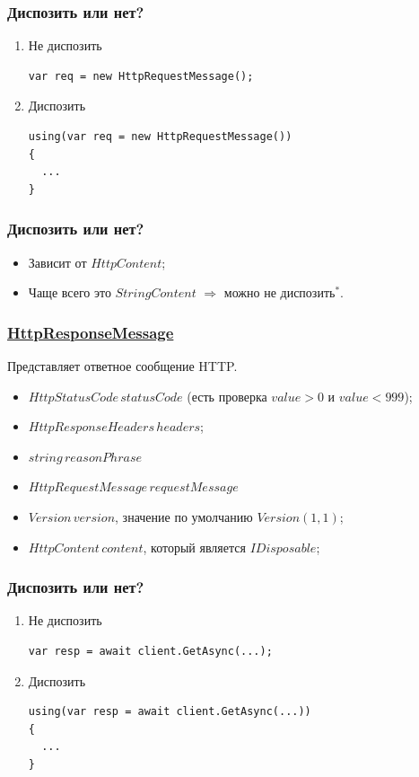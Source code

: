 \documentclass[17pt,aspectratio=169]{beamer}
\begin{document}
\begin{frame}[fragile]
\frametitle{Диспозить или нет?}
\begin{enumerate}
	\item <1-> Не диспозить
\begin{lstlisting}
var req = new HttpRequestMessage();
\end{lstlisting}
	\item <2-> Диспозить
\begin{lstlisting}
using(var req = new HttpRequestMessage())
{
  ...                
}
\end{lstlisting}
\end{enumerate}
\end{frame}

\begin{frame}
\frametitle{Диспозить или нет?}
\begin{itemize}
	\item <1-> Зависит от $HttpContent$; 
	\item <2-> Чаще всего это $StringContent$ $\Rightarrow$ можно не диспозить$^*$.
\end{itemize}
\end{frame}

\begin{frame}
\frametitle{\href{https://docs.microsoft.com/en-us/dotnet/api/system.net.http.httpresponsemessage?view=netcore-2.2}{HttpResponseMessage}}
Представляет ответное сообщение HTTP.
\begin{itemize}
	\item $HttpStatusCode\,statusCode$ (есть проверка $value > 0$ и $value < 999$);
	\item $HttpResponseHeaders\,headers$;
	\item $string\,reasonPhrase$
	\item $HttpRequestMessage\,requestMessage$
	\item $Version\,version$, значение по умолчанию $Version(1, 1)$;
	\item $HttpContent\,content$, который является $IDisposable$;
\end{itemize}
\end{frame}

\begin{frame}[fragile]
\frametitle{Диспозить или нет?}
\begin{enumerate}
	\item <1-> Не диспозить
\begin{lstlisting}
var resp = await client.GetAsync(...);
\end{lstlisting}
	\item <2-> Диспозить
\begin{lstlisting}
using(var resp = await client.GetAsync(...))
{
  ...                
}
\end{lstlisting}
\end{enumerate}
\end{frame}
\end{document}
